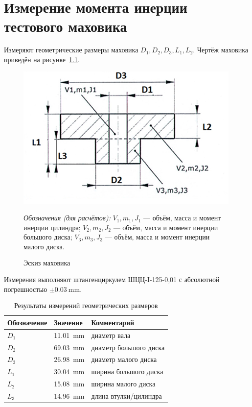 \chapter{Измерение момента инерции тестового маховика}\label{app:A}

Измеряют геометрические размеры маховика $D_1,D_2,D_3,L_1,L_2$. Чертёж маховика приведён на рисунке~\cref{fig:flywheel-sketch}.




\begin{figure}[h]
	\centering
	\includegraphics[width=.9\linewidth]{images/flywheel}
	\caption{Эскиз маховика}
	\label{fig:flywheel-sketch}
	\captionsetup{justification=centering}
	\vspace{2mm}
	\small
	\begin{minipage}{.92\linewidth}
		\textit{Обозначения (для расчётов):}
		\(V_1,m_1,J_1\) — объём, масса и момент инерции цилиндра;
		\(V_2,m_2,J_2\) — объём, масса и момент инерции большого диска;
		\(V_3,m_3,J_3\) — объём, масса и момент инерции малого диска.
	\end{minipage}
\end{figure}

Измерения выполняют штангенциркулем ШЦЦ-I-125-0,01
с абсолютной погрешностью \(\pm\SI{0.03}{\milli\meter}\).

\begin{table}[h]
	\centering
	\begin{threeparttable}
		\caption{Результаты измерений геометрических размеров}
		\label{tab:geom}
		\begin{tabular}{@{}lll@{}}
			\toprule
			Обозначение & Значение & Комментарий \\
			\midrule
			\(D_1\) & \SI{11.01}{\milli\meter} & диаметр вала \\
			\(D_2\) & \SI{69.03}{\milli\meter} & диаметр большого диска \\
			\(D_3\) & \SI{26.98}{\milli\meter} & диаметр малого диска \\
			\(L_1\) & \SI{30.04}{\milli\meter} & ширина большого диска \\
			\(L_2\) & \SI{15.08}{\milli\meter} & ширина малого диска \\
			\(L_3\) & \SI{14.96}{\milli\meter} & длина втулки/цилиндра \\
			\bottomrule
		\end{tabular}
	\end{threeparttable}
\end{table}


